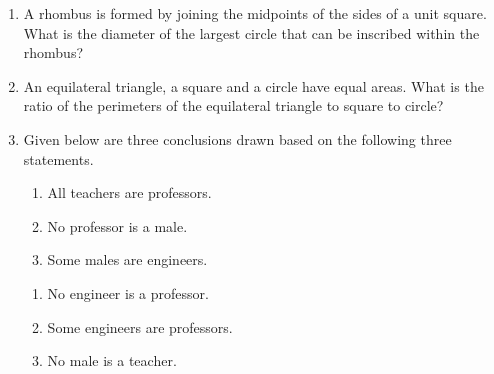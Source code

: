 \documentclass[journal,12pt,onecolumn]{IEEEtran}
\theoremstyle{remark}
\begin{document}
\begin{enumerate}
\item A rhombus is formed by joining the midpoints of the sides of a unit square. What is the diameter of the largest circle that can be inscribed within the rhombus?

\hfill{}

\begin{enumerate}
\end{enumerate}

\item An equilateral triangle, a square and a circle have equal areas. What is the ratio of the perimeters of the equilateral triangle to square to circle?

\hfill{}

\begin{enumerate}
\end{enumerate}

\pagebreak

\item Given below are three conclusions drawn based on the following three statements.

\begin{enumerate}
\item All teachers are professors.
\item No professor is a male.  
\item Some males are engineers. 
\end{enumerate}

\begin{enumerate}
\item No engineer is a professor.
\item Some engineers are professors.  
\item No male is a teacher.  
\end{enumerate}


\end{enumerate}
\end{document}
